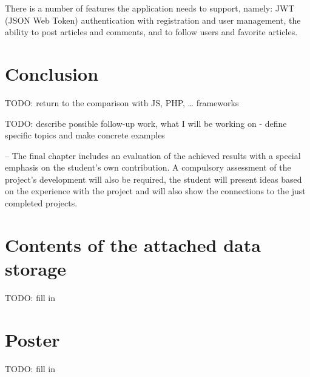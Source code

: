 \documentclass[english,odsaz]{fitthesis}
\begin{document}
There is a number of features the application needs to support, namely: JWT
(JSON Web Token) authentication with registration and user management, the
ability to post articles and comments, and to follow users and favorite articles.

\chapter{Conclusion}
\label{sec:org1acab83}
TODO: return to the comparison with JS, PHP, \ldots{} frameworks

TODO: describe possible follow-up work, what I will be working on - define
specific topics and make concrete examples

-- The final chapter includes an evaluation of the achieved results with a special
emphasis on the student's own contribution. A compulsory assessment of the
project's development will also be required, the student will present ideas
based on the experience with the project and will also show the connections to
the just completed projects. \cite{Pravidla}

\makeatletter
\def\@openbib@code{\addcontentsline{toc}{chapter}{Bibliography}}
\makeatother


\begin{flushleft}

\end{flushleft}
\iftwoside\cleardoublepage\fi

\appendix
\appendixpage
\iftwoside\cleardoublepage\fi

\startcontents[chapters]
\iftwoside\cleardoublepage\fi

\chapter{Contents of the attached data storage}
\label{sec:org782e9b7}
TODO: fill in

\chapter{Poster}
\label{sec:org2ff5cd8}
TODO: fill in
\end{document}

